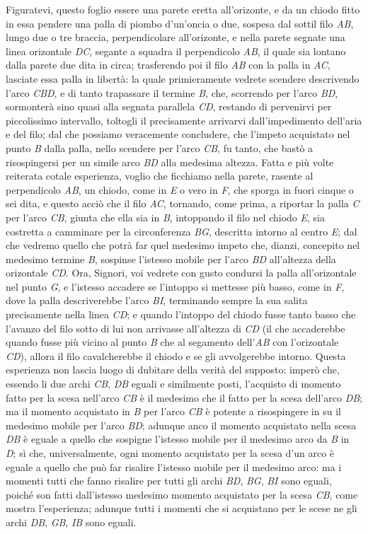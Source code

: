 \documentclass[11pt,twoside,openany]{book}
\begin{document}
Figuratevi, questo foglio essere una parete eretta all'orizonte, e da un chiodo fitto in essa pendere una palla di piombo d'un'oncia o due, sospesa dal sottil filo \emph{AB}, lungo due o tre braccia, perpendicolare all'orizonte, e nella parete segnate una linea orizontale \emph{DC}, segante a squadra il perpendicolo \emph{AB}, il quale sia lontano dalla parete due dita in circa; trasferendo poi il filo \emph{AB} con la palla in \emph{AC}, lasciate essa palla in libertà: la quale primieramente vedrete scendere descrivendo l'arco \emph{CBD}, e di tanto trapassare il termine \emph{B}, che, scorrendo per l'arco \emph{BD}, sormonterà sino quasi alla segnata parallela \emph{CD}, restando di pervenirvi per piccolissimo intervallo, toltogli il precisamente arrivarvi dall'impedimento dell'aria e del filo; dal che possiamo veracemente concludere, che l'impeto acquistato nel punto \emph{B} dalla palla, nello scendere per l'arco \emph{CB}, fu tanto, che bastò a risospingersi per un simile arco \emph{BD} alla medesima altezza. Fatta e più volte reiterata cotale esperienza, voglio che ficchiamo nella parete, rasente al perpendicolo \emph{AB}, un chiodo, come in \emph{E} o vero in \emph{F}, che sporga in fuori cinque o sei dita, e questo acciò che il filo \emph{AC}, tornando, come prima, a riportar la palla \emph{C} per l'arco \emph{CB}, giunta che ella sia in \emph{B}, intoppando il filo nel chiodo \emph{E}, sia costretta a camminare per la circonferenza \emph{BG}, descritta intorno al centro \emph{E}; dal che vedremo quello che potrà far quel medesimo impeto che, dianzi, concepito nel medesimo termine \emph{B}, sospinse l'istesso mobile per l'arco \emph{BD} all'altezza della orizontale \emph{CD}. Ora, Signori, voi vedrete con gusto condursi la palla all'orizontale nel punto \emph{G}, e l'istesso accadere se l'intoppo si mettesse più basso, come in \emph{F}, dove la palla descriverebbe l'arco \emph{BI}, terminando sempre la sua salita precisamente nella linea \emph{CD}; e quando l'intoppo del chiodo fusse tanto basso che l'avanzo del filo sotto di lui non arrivasse all'altezza di \emph{CD} (il che accaderebbe quando fusse più vicino al punto \emph{B} che al segamento dell'\emph{AB} con l'orizontale \emph{CD}), allora il filo cavalcherebbe il chiodo e se gli avvolgerebbe intorno. Questa esperienza non lascia luogo di dubitare della verità del supposto: imperò che, essendo li due archi \emph{CB}, \emph{DB} eguali e similmente posti, l'acquisto di momento fatto per la scesa nell'arco \emph{CB} è il medesimo che il fatto per la scesa dell'arco \emph{DB}; ma il momento acquistato in \emph{B} per l'arco \emph{CB} è potente a risospingere in su il medesimo mobile per l'arco \emph{BD}; adunque anco il momento acquistato nella scesa \emph{DB} è eguale a quello che sospigne l'istesso mobile per il medesimo arco da \emph{B} in \emph{D}; sì che, universalmente, ogni momento acquistato per la scesa d'un arco è eguale a quello che può far risalire l'istesso mobile per il medesimo arco: ma i momenti tutti che fanno risalire per tutti gli archi \emph{BD}, \emph{BG}, \emph{BI} sono eguali, poiché son fatti dall'istesso medesimo momento acquistato per la scesa \emph{CB}, come mostra l'esperienza; adunque tutti i momenti che si acquistano per le scese ne gli archi \emph{DB}, \emph{GB}, \emph{IB} sono eguali.
\end{document}
